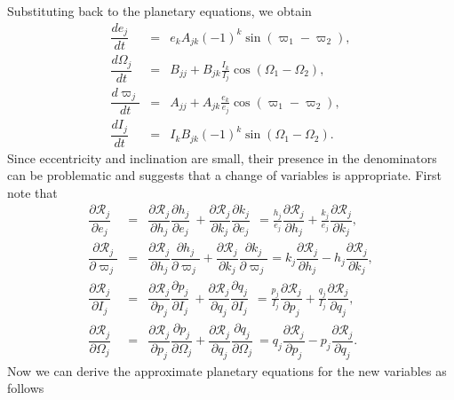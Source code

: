 \documentclass [12pt, a4paper] {article}
\newcommand{\pdiff}[2]
{
	\dfrac{\partial #1}{\partial #2}
}
\newcommand{\diff}[2]
{
	\dfrac{d #1}{d #2}
}
\begin{document}
Substituting back to the planetary equations, we obtain 
\begin{eqnarray}
    \diff{e_j}{t}
    &=&
    e_kA_{jk}(-1)^k\sin(\varpi_1 - \varpi_2), 
    \\
    \diff{\Omega_j}{t}
    &=&
    B_{jj} 
    + 
    B_{jk}\frac{I_k}{I_j}\cos(\Omega_1 - \Omega_2),
    \\
    \diff{\varpi_j}{t}
    &=&
    A_{jj}
    + 
    A_{jk}\frac{e_k}{e_j}\cos(\varpi_1 - \varpi_2),
    \\
    \diff{I_j}{t}
    &=& 
    I_kB_{jk}(-1)^k\sin(\Omega_1 - \Omega_2).
\end {eqnarray}
Since eccentricity and inclination are small, their presence in the denominators can 
be problematic and suggests that a change of variables is appropriate. 
First note that 
\begin {eqnarray}
    \pdiff{\mathcal{R}_j}{e_j}
    &=& 
    \pdiff{\mathcal{R}_j}{h_j}\pdiff{h_j}{e_j}
    \:+
    \pdiff{\mathcal{R}_j}{k_j}\pdiff{k_j}{e_j}
    \:\:= 
    \frac{h_j}{e_j}\pdiff{\mathcal{R}_j}{h_j}
    + 
    \frac{k_j}{e_j}\pdiff{\mathcal{R}_j}{k_j},
    \\
    \pdiff{\mathcal{R}_j}{\varpi_j}
    &=& 
    \pdiff{\mathcal{R}_j}{h_j}\pdiff{h_j}{\varpi_j}
    +
    \pdiff{\mathcal{R}_j}{k_j}\pdiff{k_j}{\varpi_j}
    =
    k_j\pdiff{\mathcal{R}_j}{h_j}
    -
    h_j\pdiff{\mathcal{R}_j}{k_j},
    \\
    \pdiff{\mathcal{R}_j}{I_j}
    &=& 
    \pdiff{\mathcal{R}_j}{p_j}\pdiff{p_j}{I_j}
    \:+
    \pdiff{\mathcal{R}_j}{q_j}\pdiff{q_j}{I_j}
    \:\:=
    \frac{p_j}{I_j}\pdiff{\mathcal{R}_j}{p_j}
    + 
    \frac{q_j}{I_j}\pdiff{\mathcal{R}_j}{q_j},
    \\
    \pdiff{\mathcal{R}_j}{\Omega_j}
    &=& 
    \pdiff{\mathcal{R}_j}{p_j}\pdiff{p_j}{\Omega_j}
    +
    \pdiff{\mathcal{R}_j}{q_j}\pdiff{q_j}{\Omega_j}
    \:=
    q_j\pdiff{\mathcal{R}_j}{p_j}
    -
    p_j\pdiff{\mathcal{R}_j}{q_j}.
\end {eqnarray}
Now we can derive the approximate planetary equations for the new variables as follows 
\end{document}
